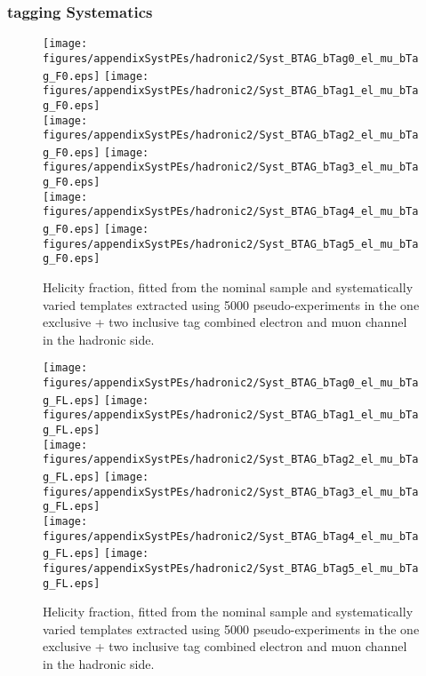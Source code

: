 \clearpage
\subsubsection{\bt tagging Systematics}

\begin{figure}[!hb]
\begin{center}
        \texttt{[image: figures/appendixSystPEs/hadronic2/Syst\_BTAG\_bTag0\_el\_mu\_bTag\_F0.eps]}
        \texttt{[image: figures/appendixSystPEs/hadronic2/Syst\_BTAG\_bTag1\_el\_mu\_bTag\_F0.eps]}\\
        \texttt{[image: figures/appendixSystPEs/hadronic2/Syst\_BTAG\_bTag2\_el\_mu\_bTag\_F0.eps]}
        \texttt{[image: figures/appendixSystPEs/hadronic2/Syst\_BTAG\_bTag3\_el\_mu\_bTag\_F0.eps]}\\
        \texttt{[image: figures/appendixSystPEs/hadronic2/Syst\_BTAG\_bTag4\_el\_mu\_bTag\_F0.eps]}
        \texttt{[image: figures/appendixSystPEs/hadronic2/Syst\_BTAG\_bTag5\_el\_mu\_bTag\_F0.eps]}
        
\caption{Helicity fraction, \fo fitted from the nominal \ttbar sample and systematically varied templates extracted using 5000 pseudo-experiments in the one exclusive + two inclusive \bt tag combined electron and muon channel in the hadronic side. }
\label{fig:systematicVar_lep_f0_elmu2incl_btag1}
\end{center}
\end{figure}

\begin{figure}[!hb]
\begin{center}
        \texttt{[image: figures/appendixSystPEs/hadronic2/Syst\_BTAG\_bTag0\_el\_mu\_bTag\_FL.eps]}
        \texttt{[image: figures/appendixSystPEs/hadronic2/Syst\_BTAG\_bTag1\_el\_mu\_bTag\_FL.eps]}\\
        \texttt{[image: figures/appendixSystPEs/hadronic2/Syst\_BTAG\_bTag2\_el\_mu\_bTag\_FL.eps]}
        \texttt{[image: figures/appendixSystPEs/hadronic2/Syst\_BTAG\_bTag3\_el\_mu\_bTag\_FL.eps]}\\
        \texttt{[image: figures/appendixSystPEs/hadronic2/Syst\_BTAG\_bTag4\_el\_mu\_bTag\_FL.eps]}
        \texttt{[image: figures/appendixSystPEs/hadronic2/Syst\_BTAG\_bTag5\_el\_mu\_bTag\_FL.eps]}
        
\caption{Helicity fraction, \fl fitted from the nominal \ttbar sample and systematically varied templates extracted using 5000 pseudo-experiments in the one exclusive + two inclusive \bt tag combined electron and muon channel in the hadronic side. }
\label{fig:systematicVar_lep_fL_elmu2incl_btag1}
\end{center}
\end{figure}

